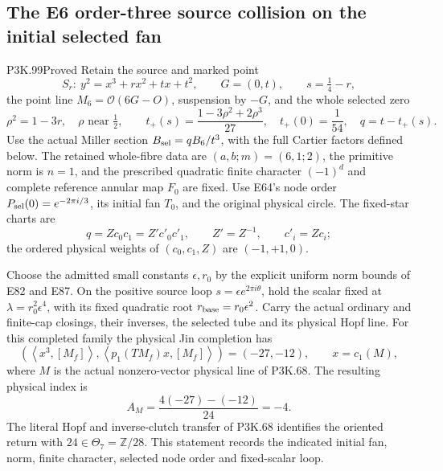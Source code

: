 \subsection{The E6 order-three source collision on the initial selected fan}
\begin{statement}{P3K.99}{Proved}
Retain the source and marked point
\[
 S_r:\ y^2=x^3+rx^2+tx+t^2,\qquad G=(0,t),\qquad s=\tfrac14-r,
\]
the point line \(M_6=\mathcal O(6G-O)\), suspension by \(-G\), and the
whole selected zero
\[
 \rho^2=1-3r,\quad \rho\text{ near }\tfrac12,\qquad
 t_+(s)=\frac{1-3\rho^2+2\rho^3}{27},\quad t_+(0)=\frac1{54},\quad
 q=t-t_+(s).
\]
Use the actual Miller section \(B_{\rm sel}=qB_6/t^3\), with the full
Cartier factors defined below. The retained whole-fibre data are
\((a,b;m)=(6,1;2)\), the primitive norm is \(n=1\), and the prescribed
quadratic finite character \((-1)^d\) and complete reference annular map
\(F_0\) are fixed. Use E64's node order \(P_{\rm sel}(0)=e^{-2\pi i/3}\),
its initial fan \(T_0\), and the original physical circle. The fixed-star charts are
\[
 q=Zc_0c_1=Z'c'_0c'_1,\qquad Z'=Z^{-1},\qquad c'_i=Zc_i;
\]
the ordered physical weights of \((c_0,c_1,Z)\) are \((-1,+1,0)\).

Choose the admitted small constants \(\epsilon,r_0\) by the explicit
uniform norm bounds of E82 and E87. On the positive source loop
\(s=\epsilon e^{2\pi i\theta}\), hold the scalar fixed at
\(\lambda=r_0^2\epsilon^4\), with its fixed quadratic root
\(r_{\rm base}=r_0\epsilon^2\). Carry the actual ordinary and finite-cap
closings, their inverses, the selected tube and its physical Hopf line.
For this completed family the physical Jin completion has
\[
 \left(\left\langle x^3,[M_f]\right\rangle,
       \left\langle p_1(TM_f)x,[M_f]\right\rangle\right)=(-27,-12),
 \qquad x=c_1(M),
\]
where \(M\) is the actual nonzero-vector physical line of P3K.68.
The resulting physical index is
\[
 A_M=\frac{4(-27)-(-12)}{24}=-4.
\]
The literal Hopf and inverse-clutch transfer of P3K.68 identifies the
oriented return with \(24\in\Theta_7=\mathbb Z/28\). This statement
records the indicated initial fan, norm, finite character, selected
node order and fixed-scalar loop.
\end{statement}
